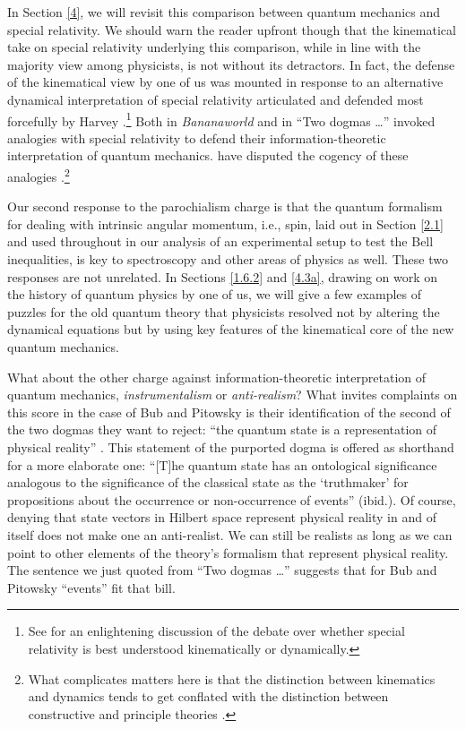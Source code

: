 In Section \ref{4}, we will revisit this comparison between quantum mechanics and special relativity. We should warn the reader upfront though that the kinematical take on special relativity underlying this comparison, while in line with the majority view among physicists, is not without its detractors. In fact, the defense of the kinematical view by one of us \citep{Janssen 2009} was mounted in response to an alternative dynamical interpretation of special relativity articulated and defended most forcefully by Harvey \citet{Brown 2005}.\footnote{See \citet{Acuna 2014} for an enlightening discussion of the debate over whether special relativity is best understood kinematically or dynamically.} Both \citet[p.\ 228]{Bub 2016} in \emph{Bananaworld} and \citet[p.\ 439]{Bub and Pitowsky 2010} in ``Two dogmas \ldots''  invoked analogies with special relativity to defend their information-theoretic interpretation of quantum mechanics. \citet{Brown and Timpson 2006} have disputed the cogency of these analogies \citep[see also][]{Timpson 2010}.\footnote{What complicates matters here is that the distinction between kinematics and dynamics tends to get conflated with the distinction between constructive and principle theories \citep[p.\ 38; see Section \ref{4.1} below for further discussion]{Janssen 2009}.}

Our second response to the parochialism charge is that the quantum formalism for dealing with intrinsic angular momentum, i.e., spin, laid out in Section \ref{2.1} and used throughout in our analysis of an experimental setup to test the Bell inequalities, is key to spectroscopy and other areas of physics as well. These two responses are not unrelated. In Sections \ref{1.6.2} and \ref{4.3a}, drawing on work on the history of quantum physics by one of us,
we will give a few examples of puzzles for the old quantum theory that physicists resolved not by altering the dynamical equations but by using key features of the kinematical core of the new quantum mechanics.  

What about the other charge against information-theoretic interpretation of quantum mechanics, \emph{instrumentalism} or \emph{anti-realism}? What invites complaints on this score in the case of Bub and Pitowsky  is their identification of the second of the two dogmas they want to reject: ``the quantum state is a representation of physical reality'' \citep[p.\ 433]{Bub and Pitowsky 2010}. This statement of the purported dogma is offered as shorthand for a more elaborate one: ``[T]he quantum state has an ontological significance analogous to the significance of the classical state as the `truthmaker' for propositions about the occurrence or non-occurrence of events'' (ibid.). Of course, denying that state vectors in Hilbert space represent physical reality in and of itself does not make one an anti-realist. We can still be realists as long as we can point to other elements of the theory's formalism that represent physical reality. The sentence we just quoted from ``Two dogmas \ldots'' suggests that for Bub and Pitowsky ``events'' fit that bill. 

